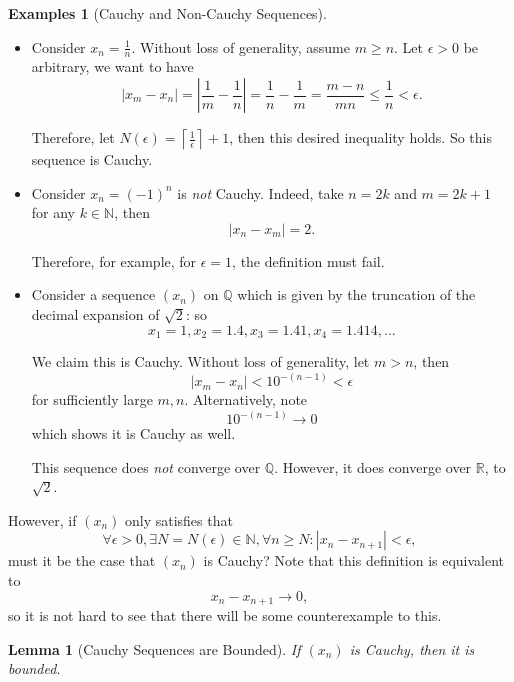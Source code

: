 \documentclass[11pt]{article}
\numberwithin{equation}{section}
\newtheorem{lemma}[theorem]{Lemma}
\theoremstyle{definition}
\newtheorem{examples}[theorem]{Examples}
\theoremstyle{remark}
\newcommand{\pqty}[1]{\left(#1\right)}
\newcommand{\abs}[1]{\left|#1\right|}
\newcommand{\ceil}[1]{\left\lceil#1\right\rceil}
\newcommand{\RR}{\mathbb R}
\newcommand{\NN}{\mathbb N}
\newcommand{\QQ}{\mathbb Q}
\begin{document}
\begin{examples}[Cauchy and Non-Cauchy Sequences]\label{analysis-unit-0023}
    \label{ex:seq-cauchy}
    \begin{itemize}
        \item Consider \(x_n = \frac{1}{n}\). Without loss of generality, assume \(m \geq n\). Let \(\epsilon > 0\) be arbitrary, we want to have
        \[
            \abs{x_m - x_n} = \abs{\frac{1}{m} - \frac{1}{n}} = \frac{1}{n} - \frac{1}{m} = \frac{m - n}{mn} \leq \frac{1}{n} < \epsilon.
        \]

        Therefore, let \(N\pqty{\epsilon} = \ceil{\frac{1}{\epsilon}} + 1\), then this desired inequality holds. So this sequence is Cauchy.

        \item Consider \(x_n = \pqty{-1}^{n}\) is \emph{not} Cauchy. Indeed, take \(n = 2k\) and \(m = 2k + 1\) for any \(k \in \NN\), then
        \[
            \abs{x_n - x_m} = 2.
        \]

        Therefore, for example, for \(\epsilon = 1\), the definition must fail.

        \item Consider a sequence \(\pqty{x_n}\) on \(\QQ\) which is given by the truncation of the decimal expansion of \(\sqrt{2}\): so
        \[
            x_1 = 1, x_2 = 1.4, x_3 = 1.41, x_4 = 1.414, \ldots
        \]

        We claim this is Cauchy. Without loss of generality, let \(m > n\), then
        \[
            \abs{x_m - x_n} < 10^{-\pqty{n - 1}} < \epsilon
        \]
        for sufficiently large \(m, n\). Alternatively, note
        \[
            10^{-\pqty{n - 1}} \to 0
        \]
        which shows it is Cauchy as well.

        This sequence does \emph{not} converge over \(\QQ\). However, it does converge over \(\RR\), to \(\sqrt{2}\).
    \end{itemize}
\end{examples}

However, if \(\pqty{x_n}\) only satisfies that
\[
\forall \epsilon > 0, \exists N = N\pqty{\epsilon} \in \NN, \forall n \geq N: \abs{x_n - x_{n + 1}} < \epsilon,
\]
must it be the case that \(\pqty{x_n}\) is Cauchy? Note that this definition is equivalent to 
\[
    x_n - x_{n + 1} \to 0,
\]
so it is not hard to see that there will be some counterexample to this.

\begin{lemma}[Cauchy Sequences are Bounded]\label{analysis-unit-0024}
    \label{lem:seq-cauchy-sequences-are-bounded}%
    If \(\pqty{x_n}\) is Cauchy, then it is bounded.
\end{lemma}
\end{document}

